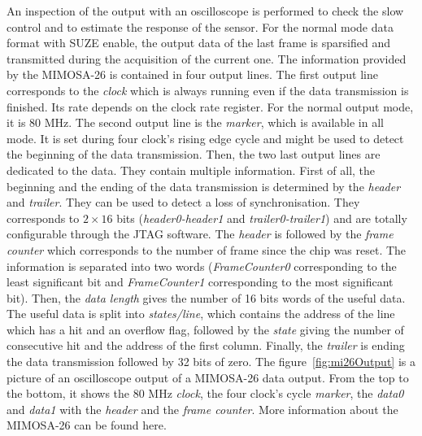   An inspection of the output with an oscilloscope is performed to check the slow control and to estimate the response of the sensor.
  For the normal mode data format with SUZE enable, the output data of the last frame is sparsified and transmitted during the acquisition of the current one.
  The information provided by the MIMOSA-26 is contained in four output lines.
  The first output line corresponds to the \textit{clock} which is always running even if the data transmission is finished. 
  Its rate depends on the clock rate register. 
  For the normal output mode, it is 80 MHz.
  The second output line is the \textit{marker}, which is available in all mode.
  It is set during four clock's rising edge cycle and might be used to detect the beginning of the data transmission.
  Then, the two last output lines are dedicated to the data.
  They contain multiple information.
  First of all, the beginning and the ending of the data transmission is determined by the \textit{header} and \textit{trailer}.
  They can be used to detect a loss of synchronisation.
  They corresponds to $2 \times 16$ bits (\textit{header0-header1} and \textit{trailer0-trailer1}) and are totally configurable through the JTAG software.
  The \textit{header} is followed by the \textit{frame counter} which corresponds to the number of frame since the chip was reset. 
  The information is separated into two words (\textit{FrameCounter0} corresponding to the least significant bit and \textit{FrameCounter1} corresponding to the most significant bit).
  Then, the \textit{data length} gives the number of 16 bits words of the useful data. 
  The useful data is split into \textit{states/line}, which contains the address of the line which has a hit and an overflow flag, followed by the \textit{state} giving the number of consecutive hit and the address of the first column.
  Finally, the \textit{trailer} is ending the data transmission followed by 32 bits of zero.
  The figure~\ref{fig:mi26Output} is a picture of an oscilloscope output of a MIMOSA-26 data output. From the top to the bottom, it shows the 80 MHz \textit{clock}, the four clock's cycle \textit{marker}, the \textit{data0} and \textit{data1} with the \textit{header} and the \textit{frame counter}.
  More information about the MIMOSA-26 can be found here.

